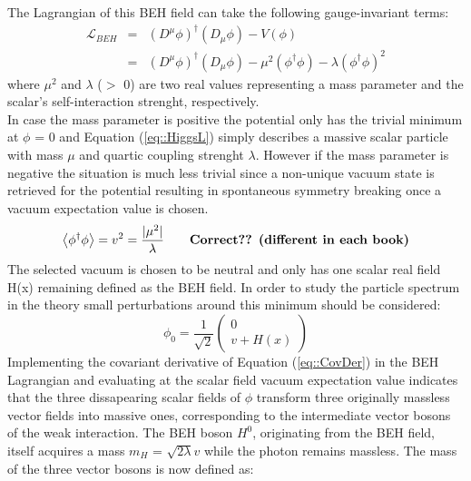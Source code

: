 The Lagrangian of this BEH field can take the following gauge-invariant terms:
\begin{eqnarray} \label{eq::HiggsL}
 \mathcal{L}_{BEH} & = & (D^{\mu} \phi)^{\dagger}(D_{\mu} \phi) - V(\phi) \nonumber \\
                   & = & (D^{\mu} \phi)^{\dagger}(D_{\mu} \phi) - \mu^{2} (\phi^{\dagger} \phi) - \lambda (\phi^{\dagger} \phi)^{2}
\end{eqnarray}
where $\mu^{2}$ and $\lambda$ ($>$ 0) are two real values representing a mass parameter and the scalar's self-interaction strenght, respectively.
\\
In case the mass parameter is positive the potential only has the trivial minimum at $\phi$ = 0 and Equation (\ref{eq::HiggsL}) simply describes a massive scalar particle with mass $\mu$ and quartic coupling strenght $\lambda$. However if the mass parameter is negative the situation is much less trivial since a non-unique vacuum state is retrieved for the potential resulting in spontaneous symmetry breaking once a vacuum expectation value is chosen.
\begin{equation}
 \left< \phi^{\dagger} \phi \right> = v^{2} = \frac{\vert \mu^{2} \vert}{\lambda} \qquad \textrm{\textbf{Correct?? (different in each book)}}
\end{equation}
The selected vacuum is chosen to be neutral and only has one scalar real field H(x) remaining defined as the BEH field. 
In order to study the particle spectrum in the theory small perturbations around this minimum should be considered:
\begin{equation}
 \phi_{0} = \frac{1}{\sqrt{2}}\begin{pmatrix}
             0 \\
             v + H(x)
            \end{pmatrix}
\end{equation}
Implementing the covariant derivative of Equation (\ref{eq::CovDer}) in the BEH Lagrangian and evaluating at the scalar field vacuum expectation value indicates that the three dissapearing scalar fields of $\phi$
transform three originally massless vector fields into massive ones, corresponding to the intermediate vector bosons of the weak interaction. The BEH boson $H^{0}$, originating from the BEH field, itself acquires a mass $m_{H}$ = $\sqrt{2 \lambda}v$ while the photon remains massless. The mass of the three vector bosons is now defined as: %
